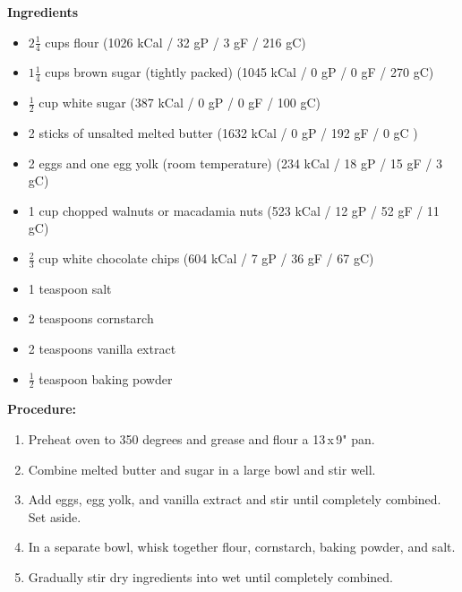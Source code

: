 \begin{multicols}{2}
\textbf{Ingredients}
\begin{itemize}
\item $2\frac{1}{4}$ cups flour \quad (1026 kCal / 32 gP / 3 gF / 216 gC)
\item $1\frac{1}{4}$ cups brown sugar (tightly packed) \newline (1045 kCal / 0 gP / 0 gF / 270 gC)
\item $\frac{1}{2}$ cup white sugar \quad (387 kCal / 0 gP / 0 gF / 100 gC)
\item 2 sticks of unsalted melted butter \newline (1632 kCal / 0 gP / 192 gF / 0 gC )
\item 2 eggs and one egg yolk (room temperature)  \newline (234 kCal / 18 gP / 15 gF / 3 gC)
\item 1 cup chopped walnuts or macadamia nuts \newline (523 kCal / 12 gP / 52 gF / 11 gC)
\item $\frac{2}{3}$ cup white chocolate chips \newline (604 kCal / 7 gP / 36 gF / 67 gC)
\item 1 teaspoon salt
\item 2 teaspoons cornstarch 
\item 2 teaspoons vanilla extract 
\item $\frac{1}{2}$ teaspoon baking powder




\end{itemize}


\columnbreak
\textbf{Procedure:}
\medskip


\begin{enumerate}
\item Preheat oven to 350 degrees and grease and flour a 13\,x\,9" pan. 


\medskip
\item Combine melted butter and sugar in a large bowl and stir well.
\medskip

\medskip
\item Add eggs, egg yolk, and vanilla extract and stir until completely combined. Set aside.
\medskip

\medskip
\item In a separate bowl, whisk together flour, cornstarch, baking powder, and salt.
\medskip

\medskip
\item Gradually stir dry ingredients into wet until completely combined.
\medskip


\end{enumerate}
\end{multicols}
